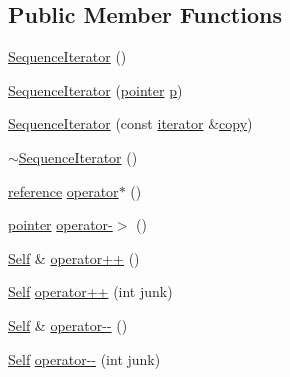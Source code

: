 \subsection*{Public Member Functions}
\begin{DoxyCompactItemize}
\item 
\hyperlink{structprism_1_1_sequence_iterator_a79834d7c3eed7825d784cd3f9e9cbe35}{Sequence\+Iterator} ()
\item 
\hyperlink{structprism_1_1_sequence_iterator_aa2c2b6ea87adefd00554b90f78e49419}{Sequence\+Iterator} (\hyperlink{structprism_1_1_sequence_iterator_aba1344ee0e1c4be6658f8a3413c66df2}{pointer} \hyperlink{structprism_1_1_sequence_iterator_aea1d104b7fda3ca8899fefa896fa59e6}{p})
\item 
\hyperlink{structprism_1_1_sequence_iterator_a071cbca99558550e5921a31f8a12a1b8}{Sequence\+Iterator} (const \hyperlink{structprism_1_1_sequence_iterator_ac791d493ea5fafcc435a83dbe2385a1e}{iterator} \&\hyperlink{namespaceprism_ae776f4cd825f79e7af1cf6ee1d90a209}{copy})
\item 
\hyperlink{structprism_1_1_sequence_iterator_a1054dee492323413c49ee157be9d36e2}{$\sim$\+Sequence\+Iterator} ()
\item 
\hyperlink{structprism_1_1_sequence_iterator_ac93bc1c2e901ea09aba9c3af33da21ba}{reference} \hyperlink{structprism_1_1_sequence_iterator_a2a6cb209944cb43cbd2f90be97eb5b36}{operator$\ast$} ()
\item 
\hyperlink{structprism_1_1_sequence_iterator_aba1344ee0e1c4be6658f8a3413c66df2}{pointer} \hyperlink{structprism_1_1_sequence_iterator_a21d21324636a334a981021d54c200949}{operator-\/$>$} ()
\item 
\hyperlink{structprism_1_1_sequence_iterator_ab79c94ff5b3328808b659f19d6bc0301}{Self} \& \hyperlink{structprism_1_1_sequence_iterator_af331b5bc9256eebb873e095a76689c59}{operator++} ()
\item 
\hyperlink{structprism_1_1_sequence_iterator_ab79c94ff5b3328808b659f19d6bc0301}{Self} \hyperlink{structprism_1_1_sequence_iterator_ad2b77b3c64e1c3fd0577ca74faac7209}{operator++} (int junk)
\item 
\hyperlink{structprism_1_1_sequence_iterator_ab79c94ff5b3328808b659f19d6bc0301}{Self} \& \hyperlink{structprism_1_1_sequence_iterator_af9a8c57ba82eb6c2b05f46294c644fe0}{operator-\/-\/} ()
\item 
\hyperlink{structprism_1_1_sequence_iterator_ab79c94ff5b3328808b659f19d6bc0301}{Self} \hyperlink{structprism_1_1_sequence_iterator_a26f87e0f93a7a793a64be34989728389}{operator-\/-\/} (int junk)

\end{DoxyCompactItemize}
